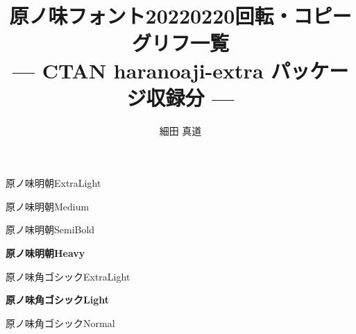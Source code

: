 \documentclass[dvipdfmx]{jsarticle}
\title{原ノ味フォント20220220回転・コピーグリフ一覧 \\
--- CTAN haranoaji-extra パッケージ収録分 ---}
\author{細田 真道}
\begin{document}
\maketitle

\clearpage
\parindent=0pt
\fboxsep=0pt

\mcfamily\ltseries
{\Large 原ノ味明朝\textmd{ExtraLight}}

\testAll

\clearpage

\mcfamily\mdseries
{\Large 原ノ味明朝\textmd{Medium}}

\testAll

\clearpage

\mgfamily %
{\Large 原ノ味明朝\textmd{SemiBold}}

\testAll

\clearpage

\mcfamily\bfseries
{\Large 原ノ味明朝\textmd{Heavy}}

\testAll

\clearpage

\gtfamily\mdseries
{\Large 原ノ味角ゴシック\textmd{ExtraLight}}

\testAll

\clearpage

\gtfamily\bfseries
{\Large 原ノ味角ゴシック\textmd{Light}}

\testAll

\clearpage

\gtfamily\ebseries
{\Large 原ノ味角ゴシック\textmd{Normal}}

\testAll
\end{document}
